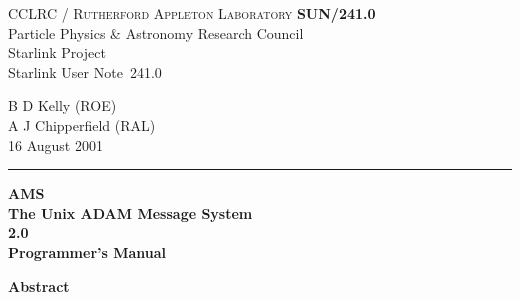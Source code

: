 \documentclass[twoside,11pt]{article}
\newcommand{\stardoccategory}  {Starlink User Note}
\newcommand{\stardocinitials}  {SUN}
\newcommand{\stardocnumber}    {241.0}
\newcommand{\stardocauthors}   {B D Kelly (ROE)\\
                                A J Chipperfield (RAL)}
\newcommand{\stardocdate}      {16 August 2001}
\newcommand{\stardoctitle}     {AMS\\The Unix ADAM Message System}
\newcommand{\stardocversion}   {2.0}
\newcommand{\stardocmanual}    {Programmer's Manual}
\newcommand{\stardocname}{\stardocinitials /\stardocnumber}
\newenvironment{latexonly}{}{}
\renewcommand{\_}{\texttt{\symbol{95}}}
\begin{document}
\thispagestyle{empty}

\begin{latexonly}
   CCLRC / \textsc{Rutherford Appleton Laboratory} \hfill \textbf{\stardocname}\\
   {\large Particle Physics \& Astronomy Research Council}\\
   {\large Starlink Project\\}
   {\large \stardoccategory\ \stardocnumber}
   \begin{flushright}
   \stardocauthors\\
   \stardocdate
   \end{flushright}
   \vspace{-4mm}
   \rule{\textwidth}{0.5mm}
   \vspace{5mm}
   \begin{center}
   {\Huge\textbf{\stardoctitle \\ [2.5ex]}}
   {\LARGE\textbf{\stardocversion \\ [4ex]}}
   {\Huge\textbf{\stardocmanual}}
   \end{center}
   \vspace{5mm}


   \vspace{10mm}
   \begin{center}
      {\Large\textbf{Abstract}}
   \end{center}
\end{latexonly}
\end{document}
